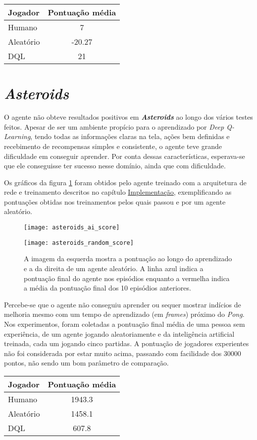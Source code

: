 \begin{center}
\begin{tabular}{l c}
\hline
Jogador & Pontuação média \\
\hline
Humano & 7 \\
Aleatório & -20.27 \\
DQL & 21 \\
\hline
\end{tabular}
\label{table:pong_score}
\end{center}

\section{\textit{Asteroids}}
\label{sec:res_asteroids}
O agente não obteve resultados positivos em \textbf{\textit{Asteroids}} ao longo dos vários testes feitos.
Apesar de ser um ambiente propício para o aprendizado por \textit{Deep Q-Learning}, tendo todas as informações claras na tela, ações bem definidas e recebimento de recompensas simples e consistente, o agente teve grande dificuldade em conseguir aprender.
Por conta dessas características, esperava-se que ele conseguisse ter sucesso nesse domínio, ainda que com dificuldade.

Os gráficos da figura \ref{fig:asteroids_score} foram obtidos pelo agente treinado com a arquitetura de rede e treinamento descritos no capítulo \hyperref[cap:implementacao]{Implementação}, exemplificando as pontuações obtidas nos treinamentos pelos quais passou e por um agente aleatório.

\begin{figure}[t]
  \begin{minipage}[t]{.5\textwidth}
  \centering
  \texttt{[image: asteroids\_ai\_score]}
  \end{minipage}
  \hfill
  \begin{minipage}[t]{.5\textwidth}
  \centering
  \texttt{[image: asteroids\_random\_score]}
  \end{minipage}
  \caption{A imagem da esquerda mostra a pontuação ao longo do aprendizado e a da direita de um agente aleatório. A linha azul indica a pontuação final do agente nos episódios enquanto a vermelha indica a média da pontuação final dos 10 episódios anteriores.}
  \vspace*{8in}
  \label{fig:asteroids_score}
\end{figure}

Percebe-se que o agente não conseguiu aprender ou sequer mostrar indícios de melhoria mesmo com um tempo de aprendizado (em \textit{frames}) próximo do \textit{Pong}.
Nos experimentos, foram coletadas a pontuação final média de uma pessoa sem experiência, de um agente jogando aleatoriamente e da inteligência artificial treinada, cada um jogando cinco partidas.
A pontuação de jogadores experientes não foi considerada por estar muito acima, passando com facilidade dos 30000 pontos, não sendo um bom parâmetro de comparação.

\begin{center}
\begin{tabular}{l c}
\hline
Jogador & Pontuação média \\
\hline
Humano & 1943.3 \\
Aleatório & 1458.1 \\
DQL & 607.8 \\
\hline
\end{tabular}
\label{table:asteroids_score}
\end{center}

